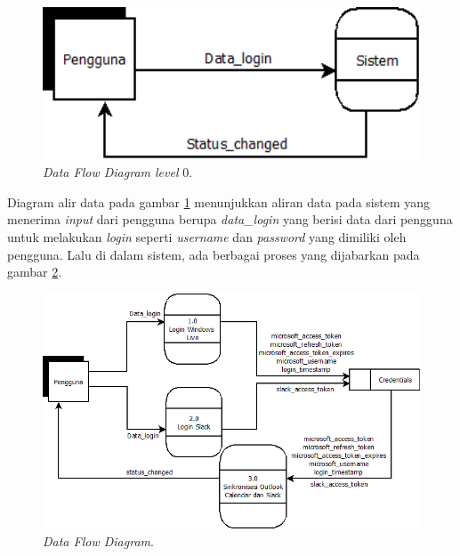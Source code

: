 \begin{figure}[h]
  \includegraphics[width=15cm]{./Gambar/DFDlvl0.png}
  \centering
  \caption{\textit{Data Flow Diagram level} 0.}
  \label{fig:dfdlvl0}
\end{figure}

Diagram alir data pada gambar \ref{fig:dfdlvl0} menunjukkan aliran data pada sistem yang menerima \textit{input} dari pengguna berupa \textit{data\_login} yang berisi data dari pengguna untuk melakukan \textit{login} seperti \textit{username} dan \textit{password} yang dimiliki oleh pengguna. Lalu di dalam sistem, ada berbagai proses yang dijabarkan pada gambar \ref{fig:dfd}. 

\begin{figure}[h]
  \includegraphics[width=15cm]{./Gambar/DFDlvl1.png}
  \centering
  \caption{\textit{Data Flow Diagram}.}
  \label{fig:dfd}
\end{figure}

